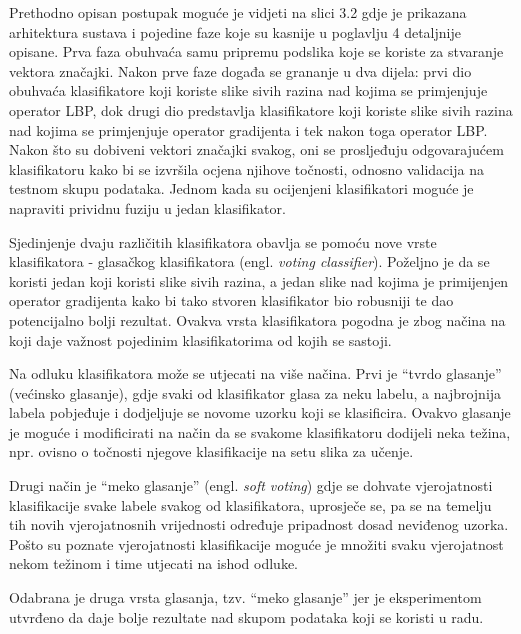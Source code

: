 \documentclass[times, utf8, zavrsni, numeric]{fer}
\begin{document}
\newpage

Prethodno opisan postupak moguće je vidjeti na slici 3.2 gdje je
prikazana arhitektura sustava i pojedine faze koje su kasnije u poglavlju 4 
detaljnije opisane. Prva faza obuhvaća samu pripremu podslika koje se 
koriste za stvaranje vektora značajki. Nakon prve faze događa se grananje
u dva dijela: prvi dio obuhvaća klasifikatore koji koriste slike sivih razina 
nad kojima se primjenjuje operator LBP, dok drugi dio predstavlja klasifikatore
koji koriste slike sivih razina nad kojima se primjenjuje operator gradijenta
i tek nakon toga operator LBP. Nakon što su dobiveni vektori značajki 
svakog, oni se prosljeđuju odgovarajućem klasifikatoru kako bi se izvršila
ocjena njihove točnosti, odnosno validacija na testnom skupu podataka.
Jednom kada su ocijenjeni klasifikatori moguće je napraviti prividnu 
fuziju u jedan klasifikator.

\bigbreak

Sjedinjenje dvaju različitih klasifikatora obavlja se pomoću nove vrste
klasifikatora - glasačkog klasifikatora (engl. \textit{voting classifier}).
Poželjno je da se koristi jedan koji koristi slike sivih razina, a jedan 
slike nad kojima je primijenjen operator gradijenta kako bi tako
stvoren klasifikator bio robusniji te dao potencijalno bolji rezultat.
Ovakva vrsta klasifikatora pogodna je zbog načina na koji daje važnost pojedinim
klasifikatorima od kojih se sastoji. 

\bigbreak

Na odluku klasifikatora može se utjecati
na više načina. Prvi je \enquote{tvrdo glasanje} (većinsko glasanje), gdje
svaki od klasifikator glasa za neku labelu, a najbrojnija labela pobjeđuje 
i dodjeljuje se novome uzorku koji se klasificira. Ovakvo glasanje je moguće i 
modificirati na način da se svakome klasifikatoru dodijeli neka težina, 
npr. ovisno o točnosti njegove klasifikacije na setu slika za učenje.

\bigbreak

Drugi način je \enquote{meko glasanje} (engl. \textit{soft voting}) gdje
se dohvate vjerojatnosti klasifikacije svake labele svakog od klasifikatora,
uprosječe se, pa se na temelju tih novih vjerojatnosnih vrijednosti određuje
pripadnost dosad neviđenog uzorka. Pošto su poznate vjerojatnosti klasifikacije
moguće je množiti svaku vjerojatnost nekom težinom i time utjecati na ishod odluke.

\bigbreak

Odabrana je druga vrsta glasanja, tzv. \enquote{meko glasanje} jer je eksperimentom
utvrđeno da daje bolje rezultate nad skupom podataka koji se koristi u radu.  
\end{document}
